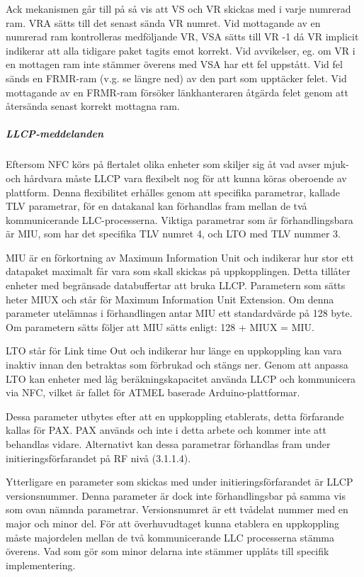 \documentclass[11pt]{article}
\begin{document}
Ack mekanismen går till på så vis att VS och VR skickas med i varje numrerad ram. VRA sätts till det senast sända VR numret. Vid mottagande av en numrerad ram kontrolleras medföljande VR, VSA sätts till VR -1 då VR implicit indikerar att alla tidigare paket tagits emot korrekt. Vid avvikelser, eg. om VR i en mottagen ram inte stämmer överens med VSA har ett fel uppstått. Vid fel sänds en FRMR-ram (v.g. se längre ned) av den part som upptäcker felet. Vid mottagande av en FRMR-ram försöker länkhanteraren åtgärda felet genom att återsända senast korrekt mottagna ram.

\subparagraph{LLCP-meddelanden}
Eftersom NFC körs på flertalet olika enheter som skiljer sig åt vad avser mjuk- och hårdvara måste LLCP vara flexibelt nog för att kunna köras oberoende av plattform. Denna flexibilitet erhålles genom att specifika parametrar, kallade TLV parametrar, för en datakanal kan förhandlas fram mellan de två kommunicerande LLC-processerna. Viktiga parametrar som är förhandlingsbara är MIU, som har det specifika TLV numret 4, och LTO med TLV nummer 3. 

MIU är en förkortning av Maximum Information Unit och indikerar hur stor ett datapaket maximalt får vara som skall skickas på uppkopplingen. Detta tillåter enheter med begränsade databuffertar att bruka LLCP. Parametern som sätts heter MIUX och står för Maximum Information Unit Extension. Om denna parameter utelämnas i förhandlingen antar MIU ett standardvärde på 128 byte. Om parametern sätts följer att MIU sätts enligt: 128 + MIUX = MIU.

LTO står för Link time Out och indikerar hur länge en uppkoppling kan vara inaktiv innan den betraktas som förbrukad och stängs ner. Genom att anpassa LTO kan enheter med låg beräkningskapacitet använda LLCP och kommunicera via NFC, vilket är fallet för ATMEL baserade Arduino-plattformar. 

Dessa parameter utbytes efter att en uppkoppling etablerats, detta förfarande kallas för PAX. PAX används och inte i detta arbete och kommer inte att behandlas vidare. Alternativt kan dessa parametrar förhandlas fram under initieringsförfarandet på RF nivå (3.1.1.4). 

Ytterligare en parameter som skickas med under initieringsförfarandet är LLCP versionsnummer. Denna parameter är dock inte förhandlingsbar på samma vis som ovan nämnda parametrar. Versionsnumret är ett tvådelat nummer med en major och minor del. För att överhuvudtaget kunna etablera en uppkoppling måste majordelen mellan de två kommunicerande LLC processerna stämma överens. Vad som gör som minor delarna inte stämmer upplåts till specifik implementering.
\end{document}
